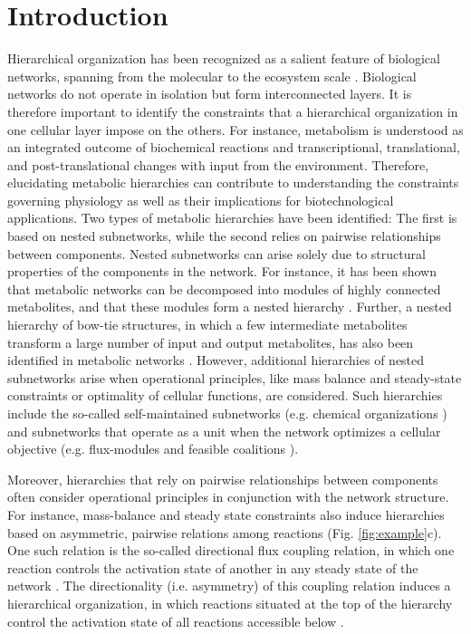 \documentclass[12pt]{article}
\begin{document}
\section{Introduction}
Hierarchical organization has been recognized as a salient feature of biological networks, spanning from the molecular to the ecosystem scale \cite{Miller2008,Erwin2009,Mengistu2016,Meunier2010,Ravasz2002}. Biological networks do not operate in isolation but form interconnected layers. It is therefore important to identify the constraints that a hierarchical organization in one cellular layer impose on the others. For instance, metabolism is understood as an integrated outcome of biochemical reactions and transcriptional, translational, and post-translational changes with input from the environment. Therefore, elucidating metabolic hierarchies can contribute to understanding the constraints governing physiology as well as their implications for biotechnological applications.
Two types of metabolic hierarchies have been identified: The first is based on nested subnetworks, while the second relies on pairwise relationships between components. Nested subnetworks can arise solely due to structural properties of the components in the network. For instance, it has been shown that metabolic networks can be decomposed into modules of highly connected metabolites, and that these modules form a nested hierarchy \cite{Ravasz2002}. Further, a nested hierarchy of bow-tie structures, in which a few intermediate metabolites transform a large number of input and output metabolites, has also been identified in metabolic networks \cite{Zhao2006}. However, additional hierarchies of nested subnetworks arise when operational principles, like mass balance and steady-state constraints or optimality of cellular functions, are considered. Such hierarchies include the so-called self-maintained subnetworks (e.g. chemical organizations \cite{Dittrich2007,Fontana1994}) and subnetworks that operate as a unit when the network optimizes a cellular objective (e.g. flux-modules \cite{Kelk2012,Muller2014a,Reimers2015b} and feasible coalitions \cite{Sajitz-Hermstein2012}).

Moreover, hierarchies that rely on pairwise relationships between components often consider operational principles in conjunction with the network structure. For instance, mass-balance and steady state constraints also induce hierarchies based on asymmetric, pairwise relations among reactions (Fig. \ref{fig:example}c). One such relation is the so-called directional flux coupling relation, in which one reaction controls the activation state of another in any steady state of the network \cite{Burgard2004a}. The directionality (i.e. asymmetry) of this coupling relation induces a hierarchical organization, in which reactions situated at the top of the hierarchy control the activation state of all reactions accessible below \cite{Hosseini2015}.
\end{document}
